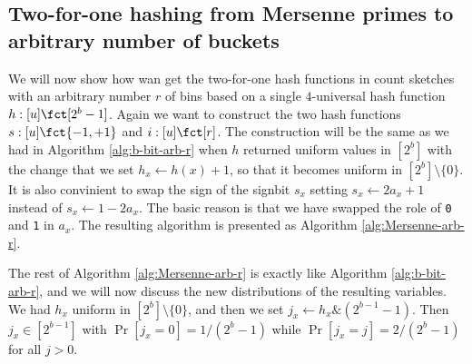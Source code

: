 \subsection{Two-for-one hashing from Mersenne primes to arbitrary number of buckets}
We will now show how wan get the two-for-one hash functions in count
sketches with an arbitrary number $r$ of bins based on a single
$4$-universal hash function $h:[u]\fct [2^b-1]$.  Again we want to
construct the two hash functions $s:[u]\fct\{-1,+1\}$ and
$i:[u]\fct[r]$.  The construction will be the same as we had in
Algorithm \ref{alg:b-bit-arb-r} when $h$ returned uniform values in
$[2^b]$ with the change that we set $h_x\gets h(x)+1$, so that it
becomes uniform in $[2^b]\setminus\{0\}$. It is also convinient to
swap the sign of the signbit $s_x$ setting $s_x\gets 2a_x+1$ instead
of $s_x\gets 1-2a_x$. The basic reason is that we have swapped the
role of \texttt{0} and \texttt{1} in $a_x$.  The resulting algorithm
is presented as Algorithm \ref{alg:Mersenne-arb-r}.
The rest of Algorithm \ref{alg:Mersenne-arb-r} is exactly like 
Algorithm \ref{alg:b-bit-arb-r}, and we will now discuss the new
distributions of the resulting variables. We had
$h_x$ uniform in $[2^b]\setminus\{0\}$, and then we set
$j_x \gets h_x\&(2^{b-1}-1)$. Then $j_x\in[2^{b-1}]$ with 
$\Pr[j_x=0]=1/(2^{b}-1)$ while  $\Pr[j_x=j]=2/(2^{b}-1)$ for all $j>0$.

